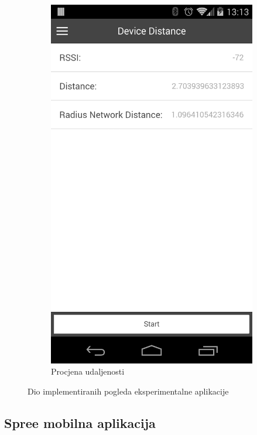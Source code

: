\begin{figure}[H]
\begin{subfigure}[b]{0.45\textwidth}
        \includegraphics[scale=0.15]{pictures/experimental4}
        \caption{Procjena udaljenosti}
        \label{fig:exp4}
    \end{subfigure}
    
    \caption{Dio implementiranih pogleda eksperimentalne aplikacije}
\end{figure}

\subsection{Spree mobilna aplikacija}

